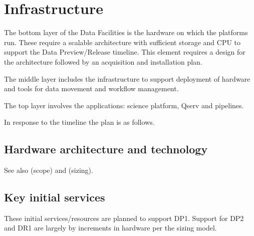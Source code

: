 \section{Infrastructure}\label{sec:plan}

The bottom layer of the Data Facilities is the hardware on which the
platforms run. These require a scalable architecture with sufficient
storage and \gls{CPU} to support the Data Preview/Release timeline.  This
element requires a design for the architecture followed by an
acquisition and installation plan.

The middle layer includes the infrastructure to support deployment of
hardware and tools for data movement and workflow management.

 The top layer involves the applications: science platform, \gls{Qserv} and pipelines.

In response to the timeline  the plan is as follows.

\subsection {Hardware architecture and technology}

See also  (scope) and   (sizing).

\subsection{Key initial services}

These initial services/resources are planned to support \gls{DP1}. Support
for \gls{DP2} and DR1 are largely by increments in hardware per the sizing model.

